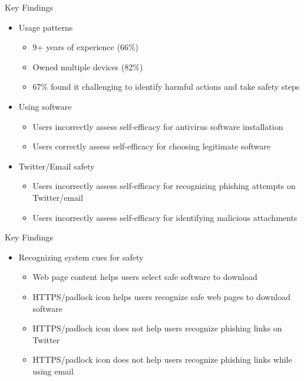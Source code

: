 \begin{frame}{Key Findings}
\begin{itemize}
\item Usage patterns
\begin{itemize}
\item 9+ years of experience (66\%)
\item Owned multiple devices (82\%)
\item 67\% found it challenging to identify harmful actions and take safety steps
\end{itemize}

\item Using software
\begin{itemize}
\item Users incorrectly assess self-efficacy for antivirus software installation
\item Users correctly assess self-efficacy for choosing legitimate software
\end{itemize}

\item Twitter/Email safety
\begin{itemize}
\item Users incorrectly assess self-efficacy for recognizing phishing attempts on Twitter/email
\item Users incorrectly assess self-efficacy for identifying malicious attachments
\end{itemize}
\end{itemize}
\end{frame}

\begin{frame}{Key Findings}
\begin{itemize}
\item Recognizing system cues for safety
\begin{itemize}
\item Web page content helps users select safe software to download
\item HTTPS/padlock icon helps users recognize safe web pages to download software
\item HTTPS/padlock icon does not help users recognize phishing links on Twitter
\item HTTPS/padlock icon does not help users recognize phishing links while using email
\end{itemize}
\end{itemize}

\end{frame}